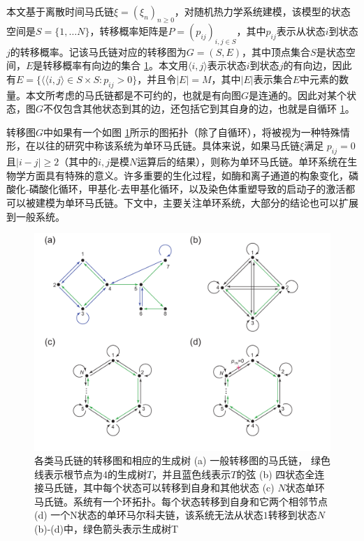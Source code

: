 
本文基于离散时间马氏链$\xi = (\xi_n)_{n \ge 0}$，对随机热力学系统建模，该模型的状态空间是$S = \{1, \dots N\}$，转移概率矩阵是$P=(p_{ij})_{i,j \in S}$，其中$p_{ij}$表示从状态$i$到状态$j$的转移概率。记该马氏链对应的转移图为$G=(S, E)$，其中顶点集合$S$是状态空间，$E$是转移概率有向边的集合 \ref{figure:transitiongraph}。本文用$\langle i, j\rangle$表示状态$i$到状态$j$的有向边，因此有$E = \{\langle \langle i, j\rangle \in S \times S: p_{ij}>0\}$，并且令$|E| = M$，其中$|E|$表示集合$E$中元素的数量。本文所考虑的马氏链都是不可约的，也就是有向图$G$是连通的。因此对某个状态，图$G$不仅包含其他状态到其的边，还包括它到其自身的边，也就是自循环 \ref{figure:transitiongraph}。

转移图$G$中如果有一个如图 \ref{figure:transitiongraph}所示的图拓扑（除了自循环），将被视为一种特殊情形，在以往的研究中称该系统为单环马氏链。具体来说，如果马氏链$\xi$满足 $p_{ij}=0$且$|i-j| \ge 2$（其中的$i,j$是模$N$运算后的结果），则称为单环马氏链。单环系统在生物学方面具有特殊的意义。许多重要的生化过程，如酶和离子通道的构象变化\cite{cornish2013fundamentals,sakmann2013single}，磷酸化-磷酸化循环\cite{beard2008chemical}，甲基化-去甲基化循环\cite{jia2017nonequilibrium}，以及染色体重塑导致的启动子的激活\cite{pedraza2008effects,jia2022analytical}都可以被建模为单环马氏链。下文中，主要关注单环系统，大部分的结论也可以扩展到一般系统。

\begin{figure}[h]\label{figure:transitiongraph}
\centering
\includegraphics[scale=0.5]{chart/transitiongraph.pdf}
\caption{各类马氏链的转移图和相应的生成树 (a) 一般转移图的马氏链， 绿色线表示根节点为4的生成树$T$，并且蓝色线表示$T$的弦 (b) 四状态全连接马氏链，其中每个状态可以转移到自身和其他状态 (c) 
$N$状态单环马氏链。系统有一个环拓扑。每个状态转移到自身和它两个相邻节点 (d) 一个N状态的单环马尔科夫链，该系统无法从状态$1$转移到状态$N$ (b)-(d)中，绿色箭头表示生成树T}
\end{figure}

